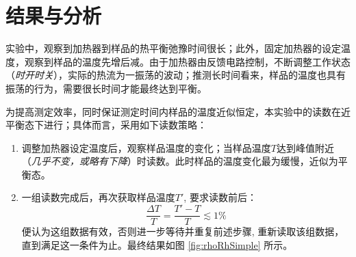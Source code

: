 \documentclass[aps,pre,12pt,preprint,%
	onecolumn,showpacs,showkeys,nofootinbib]{revtex4-1}
\begin{document}
\section{结果与分析}
%
%
	实验中，观察到加热器到样品的热平衡弛豫时间很长；此外，固定加热器的设定温度，观察到样品的温度先增后减。由于加热器由反馈电路控制，不断调整工作状态（\textit{时开时关}），实际的热流为一振荡的波动；推测长时间看来，样品的温度也具有振荡的行为，需要很长时间才能最终达到平衡。
\clearpage
	
	为提高测定效率，同时保证测定时间内样品的温度近似恒定，本实验中的读数在近平衡态下进行；具体而言，采用如下读数策略：
	\begin{enumerate}[label=\arabic*.]
	\item 调整加热器设定温度后，观察样品温度的变化；当样品温度$T$达到峰值附近（\textit{几乎不变，或略有下降}）时读数。此时样品的温度变化最为缓慢，近似为平衡态。
	\item 一组读数完成后，再次获取样品温度$T'$, 要求读数前后：
		\[ \frac{\Delta T}{T} = \frac{T' - T}{T}
			\lesssim 1\% \]
	便认为这组数据有效，否则进一步等待并重复前述步骤, 重新读取该组数据，直到满足这一条件为止。最终结果如图 \ref{fig:rhoRhSimple} 所示。	
	\end{enumerate}
	
\end{document}
